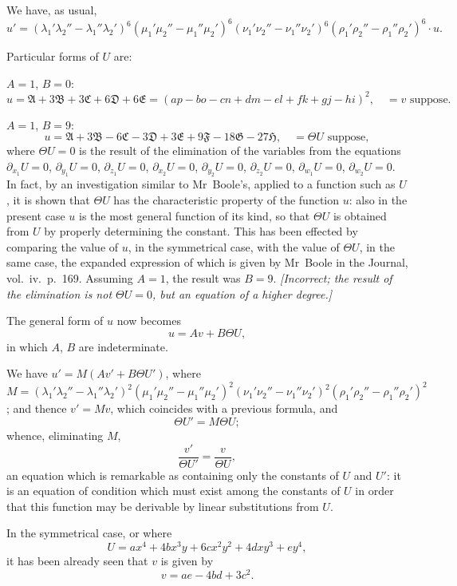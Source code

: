 \documentclass[11pt,a4paper]{article}
\theoremstyle{plain}
\theoremstyle{definition}
\theoremstyle{remark}
\begin{document}
\newpage
We have, as usual,
\[
u' = (\lambda_1'\lambda_2'' - \lambda_1''\lambda_2')^6 (\mu_1'\mu_2'' - \mu_1''\mu_2')^6 (\nu_1'\nu_2'' - \nu_1''\nu_2')^6 (\rho_1'\rho_2'' - \rho_1''\rho_2')^6 \cdot u.
\]

Particular forms of $U$ are:

$A=1$, $B=0$:
\[
u = \mathfrak{A} + 3\mathfrak{B} + 3\mathfrak{C} + 6\mathfrak{D} + 6\mathfrak{E} = (ap - bo - cn + dm - el + fk + gj - hi)^2, \quad = v \text{ suppose}.
\]

$A=1$, $B=9$:
\[
u = \mathfrak{A} + 3\mathfrak{B} - 6\mathfrak{C} - 3\mathfrak{D} + 3\mathfrak{E} + 9\mathfrak{F} - 18\mathfrak{G} - 27\mathfrak{H}, \quad = \Theta U \text{ suppose},
\]
where $\Theta U = 0$ is the result of the elimination of the variables from the equations
$\partial_{x_1}U=0$, $\partial_{y_1}U=0$, $\partial_{z_1}U=0$, $\partial_{x_2}U=0$, $\partial_{y_2}U=0$, $\partial_{z_2}U=0$, $\partial_{w_1}U=0$, $\partial_{w_2}U=0$. In fact, by
an investigation similar to Mr~Boole's, applied to a function such as $U$, it is shown
that $\Theta U$ has the characteristic property of the function $u$: also in the present case
$u$ is the most general function of its kind, so that $\Theta U$ is obtained from $U$ by
properly determining the constant. This has been effected by comparing the value of
$u$, in the symmetrical case, with the value of $\Theta U$, in the same case, the expanded
expression of which is given by Mr~Boole in the Journal, vol.~iv.\ p.~169. Assuming
$A=1$, the result was $B=9$. \textit{[Incorrect; the result of the elimination is not $\Theta U = 0$,
but an equation of a higher degree.]}

The general form of $u$ now becomes
\[
u = Av + B\Theta U,
\]
in which $A$, $B$ are indeterminate.

We have $u' = M(Av' + B\Theta U')$,
where $M = (\lambda_1'\lambda_2'' - \lambda_1''\lambda_2')^2 (\mu_1'\mu_2'' - \mu_1''\mu_2')^2 (\nu_1'\nu_2'' - \nu_1''\nu_2')^2 (\rho_1'\rho_2'' - \rho_1''\rho_2')^2$;
and thence $v' = Mv$,
which coincides with a previous formula, and
\[
\Theta U' = M \Theta U;
\]
whence, eliminating $M$,
\[
\frac{v'}{\Theta U'} = \frac{v}{\Theta U},
\]
an equation which is remarkable as containing only the constants of $U$ and $U'$: it is
an equation of condition which must exist among the constants of $U$ in order that
this function may be derivable by linear substitutions from $U$.

In the symmetrical case, or where
\[
U = ax^4 + 4bx^3y + 6cx^2y^2 + 4dxy^3 + ey^4,
\]
it has been already seen that $v$ is given by
\[
v = ae - 4bd + 3c^2.
\]
\end{document}
